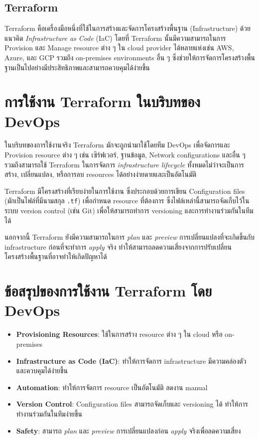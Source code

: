 \subsection{Terraform}
Terraform คือเครื่องมือหนึ่งที่ใช้ในการสร้างและจัดการโครงสร้างพื้นฐาน (Infrastructure) ด้วยแนวคิด \textit{Infrastructure as Code} (IaC) โดยที่ Terraform นั้นมีความสามารถในการ Provision และ Manage resource ต่าง ๆ ใน cloud provider ได้หลายแห่งเช่น AWS, Azure, และ GCP รวมถึง on-premises environments อื่น ๆ ซึ่งช่วยให้การจัดการโครงสร้างพื้นฐานเป็นไปอย่างมีประสิทธิภาพและสามารถควบคุมได้ง่ายขึ้น

\section*{การใช้งาน Terraform ในบริบทของ DevOps}
ในบริบทของการใช้งานจริง Terraform มักจะถูกนำมาใช้โดยทีม DevOps เพื่อจัดการและ Provision resource ต่าง ๆ เช่น เซิร์ฟเวอร์, ฐานข้อมูล, Network configurations และอื่น ๆ รวมถึงสามารถใช้ Terraform ในการจัดการ \textit{infrastructure lifecycle} ทั้งหมดไม่ว่าจะเป็นการสร้าง, เปลี่ยนแปลง, หรือการลบ resources ได้อย่างง่ายดายและเป็นอัตโนมัติ

Terraform มีโครงสร้างที่เรียบง่ายในการใช้งาน ซึ่งประกอบด้วยการเขียน Configuration files (มักเป็นไฟล์ที่มีนามสกุล \texttt{.tf}) เพื่อกำหนด resource ที่ต้องการ ซึ่งไฟล์เหล่านี้สามารถจัดเก็บไว้ในระบบ version control (เช่น Git) เพื่อให้สามารถทำการ versioning และการทำงานร่วมกันในทีมได้

นอกจากนี้ Terraform ยังมีความสามารถในการ \textit{plan} และ \textit{preview} การเปลี่ยนแปลงที่จะเกิดขึ้นกับ infrastructure ก่อนที่จะทำการ \textit{apply} จริง ทำให้สามารถลดความเสี่ยงจากการปรับเปลี่ยนโครงสร้างพื้นฐานที่อาจทำให้เกิดปัญหาได้

\section*{ข้อสรุปของการใช้งาน Terraform โดย DevOps}
\begin{itemize}
    \item \textbf{Provisioning Resources}: ใช้ในการสร้าง resource ต่าง ๆ ใน cloud หรือ on-premises
    \item \textbf{Infrastructure as Code (IaC)}: ทำให้การจัดการ infrastructure มีความคล่องตัวและควบคุมได้ง่ายขึ้น
    \item \textbf{Automation}: ทำให้การจัดการ resource เป็นอัตโนมัติ ลดงาน manual
    \item \textbf{Version Control}: Configuration files สามารถจัดเก็บและ versioning ได้ ทำให้การทำงานร่วมกันในทีมง่ายขึ้น
    \item \textbf{Safety}: สามารถ \textit{plan} และ \textit{preview} การเปลี่ยนแปลงก่อน \textit{apply} จริงเพื่อลดความเสี่ยง
\end{itemize}